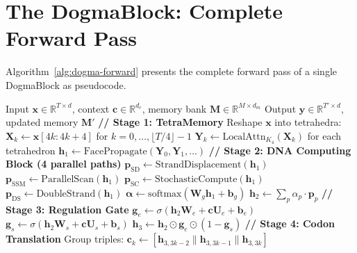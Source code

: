 \section{The DogmaBlock: Complete Forward Pass}
\label{sec:dogma-code}

Algorithm~\ref{alg:dogma-forward} presents the complete forward pass of a single DogmaBlock as pseudocode.

\begin{algorithm}[H]
\caption{DogmaBlock Forward Pass}
\label{alg:dogma-forward}
\begin{algorithmic}[1]
\Require Input $\mathbf{x} \in \mathbb{R}^{T \times d}$, context $\mathbf{c} \in \mathbb{R}^{d_c}$, memory bank $\mathbf{M} \in \mathbb{R}^{M \times d_m}$
\Ensure Output $\mathbf{y} \in \mathbb{R}^{T' \times d}$, updated memory $\mathbf{M}'$
\Statex
\State \textbf{// Stage 1: TetraMemory}
\State Reshape $\mathbf{x}$ into tetrahedra: $\mathbf{X}_k \gets \mathbf{x}[4k{:}4k{+}4]$ for $k = 0, \ldots, \lfloor T/4 \rfloor - 1$
\State $\mathbf{Y}_k \gets \mathrm{LocalAttn}_{K_4}(\mathbf{X}_k)$ for each tetrahedron 
\State $\mathbf{h}_1 \gets \mathrm{FacePropagate}(\mathbf{Y}_0, \mathbf{Y}_1, \ldots)$ 
\Statex
\State \textbf{// Stage 2: DNA Computing Block (4 parallel paths)}
\State $\mathbf{p}_{\text{SD}} \gets \mathrm{StrandDisplacement}(\mathbf{h}_1)$ 
\State $\mathbf{p}_{\text{SSM}} \gets \mathrm{ParallelScan}(\mathbf{h}_1)$ 
\State $\mathbf{p}_{\text{SC}} \gets \mathrm{StochasticCompute}(\mathbf{h}_1)$ 
\State $\mathbf{p}_{\text{DS}} \gets \mathrm{DoubleStrand}(\mathbf{h}_1)$ 
\State $\boldsymbol{\alpha} \gets \mathrm{softmax}(\mathbf{W}_g \mathbf{h}_1 + \mathbf{b}_g)$ 
\State $\mathbf{h}_2 \gets \sum_{p} \alpha_p \cdot \mathbf{p}_p$ 
\Statex
\State \textbf{// Stage 3: Regulation Gate}
\State $\mathbf{g}_e \gets \sigma(\mathbf{h}_2 \mathbf{W}_e + \mathbf{c} \mathbf{U}_e + \mathbf{b}_e)$ 
\State $\mathbf{g}_s \gets \sigma(\mathbf{h}_2 \mathbf{W}_s + \mathbf{c} \mathbf{U}_s + \mathbf{b}_s)$ 
\State $\mathbf{h}_3 \gets \mathbf{h}_2 \odot \mathbf{g}_e \odot (1 - \mathbf{g}_s)$ 
\Statex
\State \textbf{// Stage 4: Codon Translation}
\State Group triples: $\mathbf{c}_k \gets [\mathbf{h}_{3,3k-2} \| \mathbf{h}_{3,3k-1} \| \mathbf{h}_{3,3k}]$

\end{algorithmic}
\end{algorithm}
